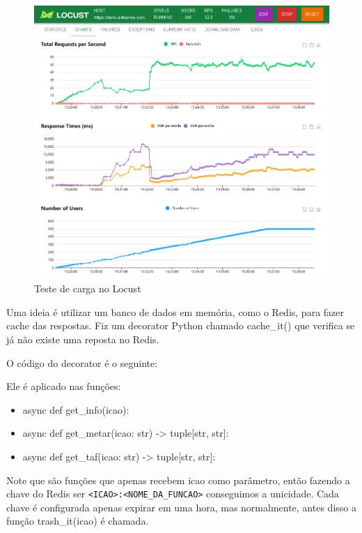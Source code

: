 \begin{figure}[ht]
    \begin{center}
    \includegraphics[width=400pt]{img/locust-no-cache.png}
    \caption{Teste de carga no Locust}
    \label{fig:locust-no-cache}
    \end{center}
\end{figure}


Uma ideia é utilizar um banco de dados em memória, como o Redis, para fazer 
cache das respostas. Fiz um decorator Python chamado cache\_it() que verifica se
já não existe uma reposta no Redis. 

O código do decorator é o seguinte:



Ele é aplicado nas funções:

\begin{itemize}
    \item async def get\_info(icao):
    \item async def get\_metar(icao: str) -> tuple[str, str]:
    \item async def get\_taf(icao: str) -> tuple[str, str]:
\end{itemize}

Note que são funções que apenas recebem icao como parâmetro, então fazendo a chave
do Redis ser \verb|<ICAO>:<NOME_DA_FUNCAO>| conseguimos a unicidade. Cada chave é 
configurada apenas expirar em uma hora, mas normalmente, antes disso a função
trash\_it(icao) é chamada.

